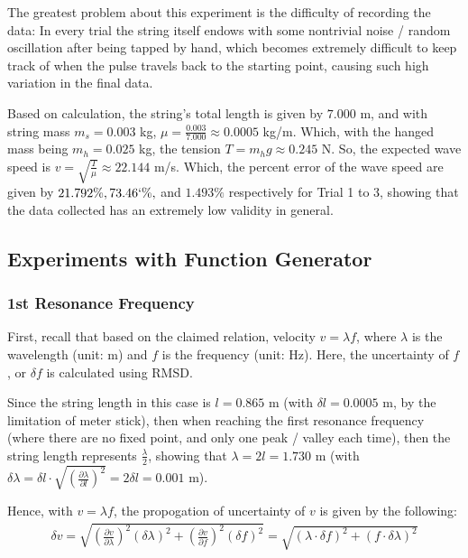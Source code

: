 \documentclass{article}
\begin{document}
The greatest problem about this experiment is the difficulty of recording the data: In every trial the string itself endows with some nontrivial noise / random oscillation after being tapped by hand, which becomes extremely difficult to keep track of when the pulse travels back to the starting point, causing such high variation in the final data.

Based on calculation, the string's total length is given by $7.000$ m, and with string mass $m_s=0.003$ kg, $\mu=\frac{0.003}{7.000}\approx 0.0005$ kg/m. Which, with the hanged mass being $m_h=0.025$ kg, the tension $T = m_hg \approx 0.245$ N. So, the expected wave speed is $v = \sqrt{\frac{T}{\mu}}\approx 22.144$ m/s. Which, the percent error of the wave speed are given by $21.792\%, 73.46`\%,$ and $1.493\%$ respectively for Trial 1 to 3, showing that the data collected has an extremely low validity in general.

\hfil

\subsection{Experiments with Function Generator}
\subsubsection{1st Resonance Frequency}
First, recall that based on the claimed relation, velocity $v=\lambda f$, where $\lambda$ is the wavelength (unit: m) and $f$ is the frequency (unit: Hz). Here, the uncertainty of $f$, or $\delta f$ is calculated using RMSD. 

Since the string length in this case is $l=0.865$ m (with $\delta l=0.0005$ m, by the limitation of meter stick), then when reaching the first resonance frequency (where there are no fixed point, and only one peak / valley each time), then the string length represents $\frac{\lambda}{2}$, showing that $\lambda=2l=1.730$ m (with $\delta \lambda=\delta l\cdot \sqrt{(\frac{\partial \lambda}{\partial l})^2} = 2\delta l = 0.001$ m). 

Hence, with $v=\lambda f$, the propogation of uncertainty of $v$ is given by the following:
\begin{align}
    \delta v= \sqrt{\left(\frac{\partial v}{\partial \lambda}\right)^2(\delta\lambda)^2+\left(\frac{\partial v}{\partial f}\right)^2(\delta f)^2} = \sqrt{(\lambda\cdot \delta f)^2 + (f\cdot \delta\lambda)^2} 
\end{align}
\end{document}
